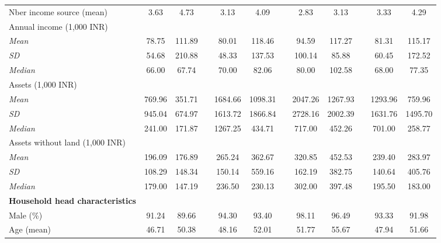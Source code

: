 \begin{table}[htbp]
{\begin{tabular}{lccccccccccc}
    Nber income source (mean) & 3.63 & 4.73 &   & 3.13 & 4.09 &   & 2.83 & 3.13 &   & 3.33 & 4.29 \\
    Annual income (1,000 INR) &   &   &   &   &   &   &   &   &   &   &  \\
    \hspace*{0.2cm} \textit{Mean} & 78.75 & 111.89 &   & 80.01 & 118.46 &   & 94.59 & 117.27 &   & 81.31 & 115.17 \\
    \hspace*{0.2cm} \textit{SD} & 54.68 & 210.88 &   & 48.33 & 137.53 &   & 100.14 & 85.88 &   & 60.45 & 172.52 \\
    \hspace*{0.2cm} \textit{Median} & 66.00 & 67.74 &   & 70.00 & 82.06 &   & 80.00 & 102.58 &   & 68.00 & 77.35 \\
    Assets (1,000 INR) &   &   &   &   &   &   &   &   &   &   &  \\
    \hspace*{0.2cm} \textit{Mean} & 769.96 & 351.71 &   & 1684.66 & 1098.31 &   & 2047.26 & 1267.93 &   & 1293.96 & 759.96 \\
    \hspace*{0.2cm} \textit{SD} & 945.04 & 674.97 &   & 1613.72 & 1866.84 &   & 2728.16 & 2002.39 &   & 1631.76 & 1495.70 \\
    \hspace*{0.2cm} \textit{Median} & 241.00 & 171.87 &   & 1267.25 & 434.71 &   & 717.00 & 452.26 &   & 701.00 & 258.77 \\
    Assets without land (1,000 INR) &   &   &   &   &   &   &   &   &   &   &  \\
    \hspace*{0.2cm} \textit{Mean} & 196.09 & 176.89 &   & 265.24 & 362.67 &   & 320.85 & 452.53 &   & 239.40 & 283.97 \\
    \hspace*{0.2cm} \textit{SD} & 108.29 & 148.34 &   & 150.14 & 559.16 &   & 162.19 & 382.75 &   & 140.64 & 405.76 \\
    \hspace*{0.2cm} \textit{Median} & 179.00 & 147.19 &   & 236.50 & 230.13 &   & 302.00 & 397.48 &   & 195.50 & 183.00 \\
    \textbf{Household head characteristics} &   &   &   &   &   &   &   &   &   &   &  \\
    Male (\%) & 91.24 & 89.66 &   & 94.30 & 93.40 &   & 98.11 & 96.49 &   & 93.33 & 91.98 \\
    Age (mean) & 46.71 & 50.38 &   & 48.16 & 52.01 &   & 51.77 & 55.67 &   & 47.94 & 51.66 \\

\end{tabular}}
\end{table}
